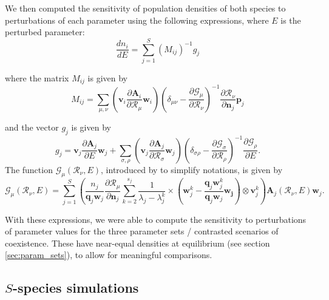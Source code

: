 \documentclass{article}
\begin{document}
We then computed the sensitivity of population densities of both species to perturbations of each parameter using the following expressions, where $E$ is the perturbed parameter:
\begin{equation}\label{eq:sensitivity_expression}
    \frac{dn_i}{dE} = \sum^S_{j=1}(M_{ij})^{-1}g_j
\end{equation}

where the matrix $M_{ij}$ is given by
\begin{equation}\label{eq:matrix_mij}
    M_{ij} = \sum_{\mu, \nu}\left(\mathbf{v}_i\frac{\partial\mathbf{A}_i}{\partial\mathcal{R}_\mu}\mathbf{w}_i\right)\left(\delta_{\mu\nu}-\frac{\partial\mathcal{G}_\mu}{\partial\mathcal{R}_\nu}\right)^{-1}\frac{\partial\mathcal{R}_\nu}{\partial\mathbf{n}_j}\mathbf{p}_j
\end{equation}

and the vector $g_j$ is given by 
\begin{equation}\label{eq:vector_gj}
    g_j=\mathbf{v}_j\frac{\partial\mathbf{A}_j}{\partial E}\mathbf{w}_j + \sum_{\sigma, \rho}\left(\mathbf{v}_j\frac{\partial\mathbf{A}_j}{\partial\mathcal{R}_\sigma}\mathbf{w}_j\right)\left(\delta_{\sigma\rho}-\frac{\partial\mathcal{G}_\sigma}{\partial\mathcal{R}_\rho}\right)^{-1}\frac{\partial\mathcal{G}_\rho}{\partial E}.
\end{equation}
The function $\mathcal{G}_\mu(\mathcal{R}_\nu,E)$, introduced by \citet{barabas2014fixed} to simplify notations, is given by
\begin{equation}\label{eq:G_mu}
    \mathcal{G}_\mu(\mathcal{R}_\nu,E) = \sum_{j=1}^{S}\left(\frac{n_j}{\mathbf{q}_j\mathbf{w}_j}\frac{\partial\mathcal{R}_\mu}{\partial\mathbf{n}_j}\sum^{s_j}_{k=2}\frac{1}{\lambda_j-\lambda_j^k} \times \left(\mathbf{w}^k_j-\frac{\mathbf{q}_j\mathbf{w}^k_j}{\mathbf{q}_j\mathbf{w}_j}\mathbf{w_j}\right)\otimes\mathbf{v}_j^k\right)\mathbf{A}_j(\mathcal{R}_\nu,E)\mathbf{w}_j.
\end{equation}

With these expressions, we were able to compute the sensitivity to perturbations of parameter values for the three parameter sets / contrasted scenarios of coexistence. These have near-equal densities at equilibrium (see section \ref{sec:param_sets}), to allow for meaningful comparisons.

\subsection{$S$-species simulations}
\end{document}
